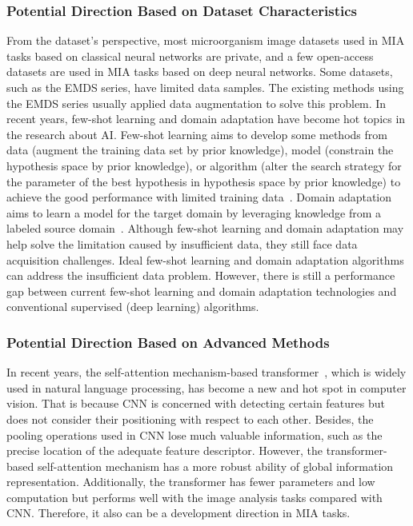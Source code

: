 \subsubsection{Potential Direction Based on Dataset Characteristics}

From the dataset's perspective, most microorganism image datasets used in MIA tasks based on classical neural networks are private, and a few open-access datasets are used in MIA tasks based on deep neural networks. Some datasets, such as the EMDS series, have limited data samples. The existing methods using the EMDS series usually applied data augmentation to solve this problem. In recent years, few-shot learning and domain adaptation have become hot topics in the research about AI. Few-shot learning aims to develop some methods from data (augment the training data set by prior knowledge), model (constrain the hypothesis space by prior knowledge), or algorithm (alter the search strategy for the parameter of the best hypothesis in hypothesis space by prior knowledge) to achieve the good performance with limited training data~\cite{Wang-2020-GAFE}. Domain adaptation aims to learn a model for the target domain by leveraging knowledge from a labeled source domain~\cite{Deng-2021-IFDU,Deng-2021-JCDF}. Although few-shot learning and domain adaptation may help solve the limitation caused by insufficient data, they still face data acquisition challenges. Ideal few-shot learning and domain adaptation algorithms can address the insufficient data problem. However, there is still a performance gap between current few-shot learning and domain adaptation technologies and conventional supervised (deep learning) algorithms.



\subsubsection{Potential Direction Based on Advanced Methods}

In recent years, the self-attention mechanism-based transformer~\cite{Vaswani-2017-AIAY}, which is widely used in natural language processing, has become a new and hot spot in computer vision. That is because CNN is concerned with detecting certain features but does not consider their positioning with respect to each other. Besides, the pooling operations used in CNN lose much valuable information, such as the precise location of the adequate feature descriptor. However, the transformer-based self-attention mechanism has a more robust ability of global information representation. Additionally, the transformer has fewer parameters and low computation but performs well with the image analysis tasks compared with CNN. Therefore, it also can be a development direction in MIA tasks.

